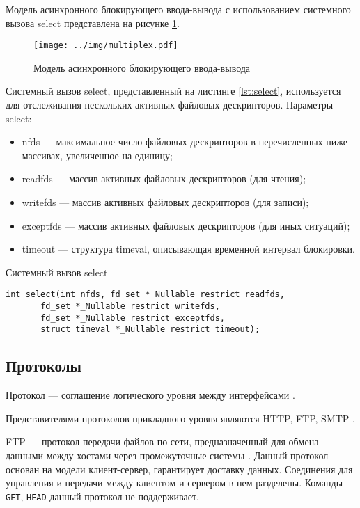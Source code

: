 Модель асинхронного блокирующего ввода-вывода с использованием системного вызова select представлена на рисунке \ref{img:multiplex}.

\begin{figure}[!htb]\centering
	\texttt{[image: ../img/multiplex.pdf]}
	\caption{Модель асинхронного блокирующего ввода-вывода}
	\label{img:multiplex}
\end{figure}

Системный вызов select, представленный на листинге \ref{lst:select}, используется для отслеживания нескольких активных файловых дескрипторов.
Параметры select:
\begin{itemize}
	\item nfds --- максимальное число файловых дескрипторов в перечисленных ниже массивах, увеличенное на единицу;
	\item readfds --- массив активных файловых дескрипторов (для чтения);
	\item writefds --- массив активных файловых дескрипторов (для записи);
	\item exceptfds --- массив активных файловых дескрипторов (для иных ситуаций);
	\item timeout --- структура timeval, описывающая временной интервал блокировки.
\end{itemize}

\begin{listing}[!h]
	\caption{Системный вызов select}
	\label{lst:select}
	\begin{verbatim}
int select(int nfds, fd_set *_Nullable restrict readfds,
	   fd_set *_Nullable restrict writefds,
	   fd_set *_Nullable restrict exceptfds,
	   struct timeval *_Nullable restrict timeout);
	\end{verbatim}
\end{listing}

\subsection{Протоколы}

Протокол --- соглашение логического уровня между интерфейсами \cite{tikhomirova2024networks}.

Представителями протоколов прикладного уровня являются HTTP, FTP, SMTP \cite{lombardi2021internet}.

FTP --- протокол передачи файлов по сети, предназначенный для обмена данными между хостами через промежуточные системы \cite{forouzan2002tcp}.
Данный протокол основан на модели клиент-сервер, гарантирует доставку данных.
Соединения для управления и передачи между клиентом и сервером в нем разделены.
Команды \texttt{GET}, \texttt{HEAD} данный протокол не поддерживает.

